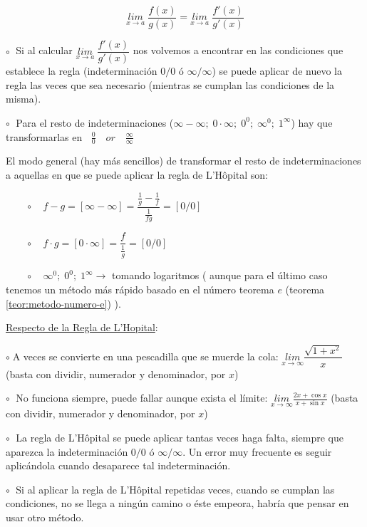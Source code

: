 	\begin{equation}
	\label{qg:LHOPITAL}		
	\underset{x\to a}{lim}\;{\dfrac {f(x)}{g(x)}}=
	\underset{x\to a}{lim}\;{\dfrac {f'(x)}{g'(x)}}
	\end{equation}
	 
	 
	
 		$\circ \;$ Si al calcular $\underset {x \to a}{lim} \; {\dfrac{f'(x)}{g'(x)}}$ nos volvemos a encontrar en las condiciones que establece la regla (indeterminación $0/0$ ó $\infty/\infty$) se puede aplicar de nuevo la regla las veces que sea necesario (mientras se cumplan las condiciones de la misma).

 		$\circ \;$ Para el resto de indeterminaciones ($\infty - \infty; \; 0\cdot \infty ;\; 0^0 ;\;   \infty^0;\; 1^{\infty}  $) hay que transformarlas en $\;\; \frac 0 0 \quad or\quad \frac {\infty}{\infty} $
	
	El modo general (hay más sencillos) de transformar el resto  de indeterminaciones a aquellas en que se puede aplicar la regla de L'Hôpital son:
	
	$\qquad \circ \quad f-g=[\infty-\infty]= \dfrac {\frac 1 g - \frac 1 f}{\frac 1 {fg}} =[0/0]	$
	
	$\qquad \circ \quad f\cdot g = [0\cdot \infty]= \dfrac {f}{\frac 1 g} =[0/0]$
	
	$\qquad \circ \quad \infty^0; \; 0^0;\; 1^{\infty} \to $ tomando logaritmos ( aunque para el último caso tenemos un método más rápido basado en el número teorema  $e$ (teorema \ref{teor:metodo-numero-e}) ).

	\underline{Respecto de la Regla de L'Hopital}:
		
	
		$\circ \;$A veces se convierte en una pescadilla que se muerde la cola: $\underset{x\to \infty}{lim}{\dfrac{\sqrt{1+x^2}}{x}}$ (basta con dividir, numerador y denominador, por $x$)
	
	 	
	
		$\circ \;$ No funciona siempre, puede fallar aunque exista el límite: $\underset{x\to \infty}{lim}{\frac{2x+\cos x}{x+\sin x}}$ (basta con dividir, numerador y denominador, por $x$)
		
		$\circ \;$ La regla de L'Hôpital se puede aplicar tantas veces haga falta, siempre que aparezca la indeterminación $0/0$ ó $\infty/\infty$. Un error muy frecuente es seguir aplicándola cuando desaparece tal indeterminación.
		
		
		$\circ \;$ Si al aplicar la regla de L'Hôpital repetidas veces, cuando se cumplan las condiciones, no se llega a ningún camino o éste empeora, habría que pensar en usar otro método.
		
